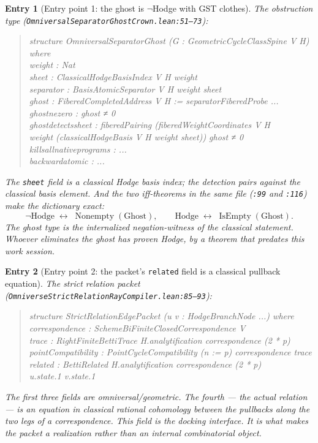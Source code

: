 \documentclass[11pt]{article}
\renewcommand{\_}{\textunderscore\allowbreak}
\newtheorem{xentry}{Entry}
\begin{document}
\begin{xentry}[Entry point 1: the ghost is $\neg$Hodge with GST clothes]
\label{entry:ghost}
The obstruction type (\texttt{OmniversalSeparatorGhostCrown.lean:51--73}):
\begin{quote}\small\ttfamily
structure OmniversalSeparatorGhost (G : GeometricCycleClassSpine V H) where\\
\phantom{~}weight : Nat\\
\phantom{~}sheet : ClassicalHodgeBasisIndex V H weight\\
\phantom{~}separator : BasisAtomicSeparator V H weight sheet\\
\phantom{~}ghost : FiberedCompletedAddress V H := separatorFiberedProbe ...\\
\phantom{~}ghost\_ne\_zero : ghost ≠ 0\\
\phantom{~}ghost\_detects\_sheet : fiberedPairing (fiberedWeightCoordinates V H\\
\phantom{~~~}weight (classicalHodgeBasis V H weight sheet)) ghost ≠ 0\\
\phantom{~}kills\_all\_native\_programs : ...\\
\phantom{~}backward\_atomic : ...
\end{quote}
The \texttt{sheet} field is a \emph{classical} Hodge basis index; the detection
pairs against the \emph{classical} basis element. And the two iff-theorems in
the same file (\texttt{:99} and \texttt{:116}) make the dictionary exact:
\[
\neg \mathrm{Hodge} \;\leftrightarrow\; \operatorname{Nonempty}(\text{Ghost}),
\qquad
\mathrm{Hodge} \;\leftrightarrow\; \operatorname{IsEmpty}(\text{Ghost}).
\]
The ghost type is the internalized negation-witness of the classical statement.
Whoever eliminates the ghost has proven Hodge, by a theorem that predates this
work session.
\end{xentry}

\begin{xentry}[Entry point 2: the packet's \texttt{related} field is a classical pullback equation]
\label{entry:packet}
The strict relation packet (\texttt{OmniverseStrictRelationRayCompiler.lean:85--93}):
\begin{quote}\small\ttfamily
structure StrictRelationEdgePacket (u v : HodgeBranchNode ...) where\\
\phantom{~}correspondence : SchemeBiFiniteClosedCorrespondence V\\
\phantom{~}trace : RightFiniteBettiTrace H.analytification correspondence (2 * p)\\
\phantom{~}pointCompatibility : PointCycleCompatibility (n := p) correspondence trace\\
\phantom{~}related : BettiRelated H.analytification correspondence (2 * p)\\
\phantom{~~~~}u.state.1 v.state.1
\end{quote}
The first three fields are omniversal/geometric. The fourth --- the actual
\emph{relation} --- is an equation in classical rational cohomology between the
pullbacks along the two legs of a correspondence. This field is the docking
interface. It is what makes the packet a \emph{realization} rather than an
internal combinatorial object.
\end{xentry}
\end{document}
